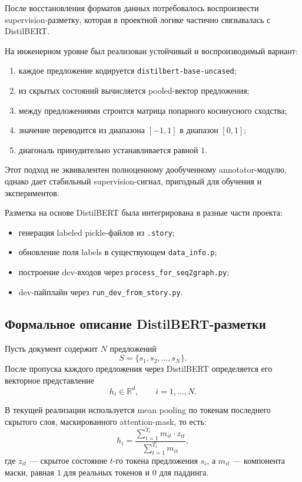 \documentclass[12pt,a4paper]{article}
\begin{document}
После восстановления форматов данных потребовалось воспроизвести supervision-разметку,
которая в проектной логике частично связывалась с DistilBERT.

На инженерном уровне был реализован устойчивый и воспроизводимый вариант:

\begin{enumerate}
    \item каждое предложение кодируется \texttt{distilbert-base-uncased};
    \item из скрытых состояний вычисляется pooled-вектор предложения;
    \item между предложениями строится матрица попарного косинусного сходства;
    \item значение переводится из диапазона $[-1,1]$ в диапазон $[0,1]$;
    \item диагональ принудительно устанавливается равной $1$.
\end{enumerate}

Этот подход не эквивалентен полноценному дообученному annotator-модулю, однако дает
стабильный supervision-сигнал, пригодный для обучения и экспериментов.

Разметка на основе DistilBERT была интегрирована в разные части проекта:

\begin{itemize}
    \item генерация labeled pickle-файлов из \texttt{.story};
    \item обновление поля labels в существующем \texttt{data\_info.p};
    \item построение dev-входов через \texttt{process\_for\_seq2graph.py};
    \item dev-пайплайн через \texttt{run\_dev\_from\_story.py}.
\end{itemize}

\subsection{Формальное описание DistilBERT-разметки}

Пусть документ содержит $N$ предложений
\[
S = \{s_1, s_2, \dots, s_N\}.
\]
После пропуска каждого предложения через DistilBERT определяется его векторное
представление
\[
h_i \in \mathbb{R}^{d}, \qquad i=1,\dots,N.
\]

В текущей реализации используется mean pooling по токенам последнего скрытого слоя,
маскированного attention-mask, то есть:
\[
h_i = \frac{\sum_{t=1}^{T_i} m_{it} \cdot z_{it}}{\sum_{t=1}^{T_i} m_{it}},
\]
где $z_{it}$ --- скрытое состояние $t$-го токена предложения $s_i$, а $m_{it}$ ---
компонента маски, равная $1$ для реальных токенов и $0$ для паддинга.
\end{document}

